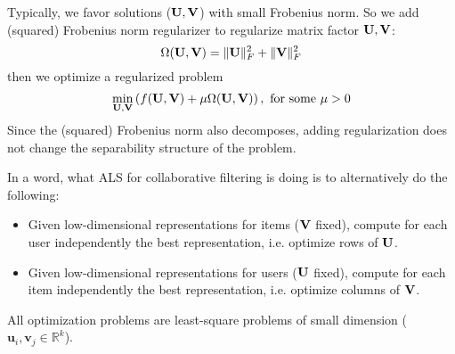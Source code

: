 \documentclass[../book-template.tex]{subfiles}
\begin{document}
\par Typically, we favor solutions (${\bf U,V}$) with small Frobenius norm. So we add (squared) Frobenius norm regularizer to regularize matrix factor ${\bf U,V}$:
\begin{equation*}
	\Omega({\bf U,V})=\|{\bf U}\|_F^2 + \|{\bf V}\|_F^2
\end{equation*}
then we optimize a regularized problem
\begin{equation*}
	\min_{{\bf U,V}} \left(f({\bf U,V})+\mu\Omega({\bf U,V})\right),\ \text{for some }\mu>0
\end{equation*}
Since the (squared) Frobenius norm also decomposes, adding regularization does not change the separability structure of the problem.
\par In a word, what ALS for collaborative filtering is doing is to alternatively do the following:
\begin{itemize}
	\item Given low-dimensional representations for items (${\bf V}$ fixed), compute for each user independently the best representation, i.e. optimize rows of ${\bf U}$.
	\item Given low-dimensional representations for users (${\bf U}$ fixed), compute for each item independently the best representation, i.e. optimize columns of ${\bf V}$.
\end{itemize}
All optimization problems are least-square problems of small dimension ($\bm{u}_i,\bm{v}_j\in \mathbb{R}^k$).
\end{document}
